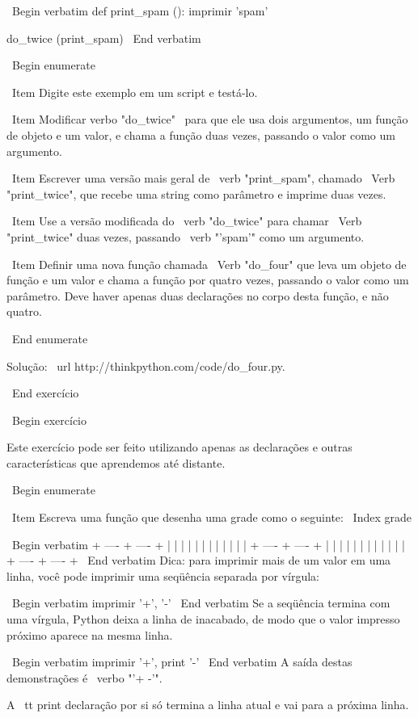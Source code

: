 \documentclass[10pt]{book}
\begin{document}
{\ Begin {verbatim}
def print_spam ():
    imprimir 'spam'

do_twice (print_spam)
\ End {verbatim}

\ Begin {enumerate}

\ Item Digite este exemplo em um script e testá-lo.

\ Item Modificar verbo "do_twice" \ para que ele usa dois argumentos, um
função de objeto e um valor, e chama a função duas vezes,
passando o valor como um argumento.

\ Item Escrever uma versão mais geral de \ verb "print_spam", chamado
\ Verb "print_twice", que recebe uma string como parâmetro e imprime
duas vezes.

\ Item Use a versão modificada do \ verb "do_twice" para chamar
\ Verb "print_twice" duas vezes, passando \ verb "'spam'" como um argumento.

\ Item Definir uma nova função chamada 
\ Verb "do_four" que leva um objeto de função e um valor
e chama a função por quatro vezes, passando o valor
como um parâmetro. Deve haver apenas
duas declarações no corpo desta função, e não quatro.

\ End {enumerate}

Solução: \ url {http://thinkpython.com/code/do_four.py}.

\ End {} exercício



\ Begin {} exercício

Este exercício pode ser
feito utilizando apenas as declarações e outras características que aprendemos até
distante.  

\ Begin {enumerate}

\ Item Escreva uma função que desenha uma grade como o seguinte:
\ Index {grade}

\ Begin {verbatim}
+ ---- + ---- +
| | |
| | |
| | |
| | |
+ ---- + ---- +
| | |
| | |
| | |
| | |
+ ---- + ---- +
\ End {verbatim}
%
Dica: para imprimir mais de um valor em uma linha, você pode imprimir
uma seqüência separada por vírgula:

\ Begin {verbatim}
imprimir '+', '-'
\ End {verbatim}
%
Se a seqüência termina com uma vírgula, Python deixa a linha de inacabado,
de modo que o valor impresso próximo aparece na mesma linha.

\ Begin {verbatim}
imprimir '+', 
print '-'
\ End {verbatim}
%
A saída destas demonstrações é \ verbo "'+ -'".

A {\ tt print} declaração por si só termina a linha atual e
vai para a próxima linha.

}
\end{document}
